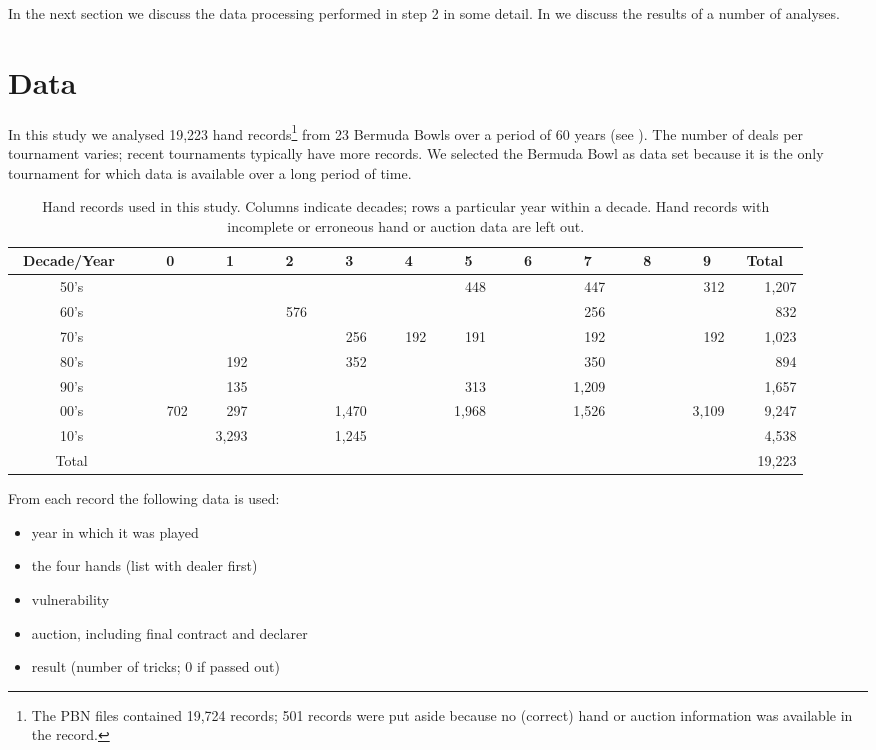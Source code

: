 \documentclass{llncs}
\begin{document}
In the next section we discuss the data processing performed in step 2
in some 
detail. In  we discuss the results of a number of
analyses.  

\section{Data}
\label{sec:data}

In this study we analysed 19,223 hand records\footnote{%
The PBN files contained 19,724 records; 501 records were put aside
because no (correct) hand or auction information was available in the
record.} 
from 23 Bermuda Bowls
over a period of 60 years (see ).  The number of deals per
tournament varies; recent tournaments typically have more records.  We
selected the Bermuda Bowl as data set because it
is the only tournament for which data is available over a long period
of time.   

\begin{table}
\centering\footnotesize
\caption{Hand records used in this study. Columns indicate decades;
  rows a particular year within  a decade. Hand records with
  incomplete or erroneous hand or auction data are left out.}
\label{tbl:data}
\begin{tabular}{|c|r|r|r|r|r|r|r|r|r|r|r|}
\hline
\bf\ Decade/Year \ &
\bf \ \ \ 0 \ &\bf \ \ \ 1 \ &\bf \ \ \ 2 \ &\bf \ \ \ 3 \ &\bf \ \ \ 4 \ &
\bf \ \ \ 5 \ &\bf \ \ \ 6 \ &\bf \ \ \ 7 \ &\bf \ \ \ 8 \ &\bf \ \ \ 9 \ &
\bf \ Total \ \\ \hline\hline
50's &  &  &  &  &  & 448 &  & 447 &  & 312 & 1,207 \\ \hline
60's &  &  & 576 &  &  &  &  & 256 &  &  & 832 \\ \hline
70's &  &  &  & 256 & 192 & 191 &  & 192 &  & 192 & 1,023 \\ \hline
80's &  & 192 &  & 352 &  &  &  & 350 &  &  & 894 \\ \hline
90's &  & 135 &  &  &  & 313 &  & 1,209 &  &  & 1,657 \\ \hline
00's & 702 & 297 &  & 1,470 &  & 1,968 &  & 1,526 &  & 3,109 & 9,247 \\ \hline
10's &  & 3,293 &  & 1,245 &  &  &  &  &  &  & 4,538 \\ \hline\hline
Total &  &  &  &  &  &  &  &  &  &  & 19,223 \\ \hline
\hline
\end{tabular}
\end{table}

From each record the following data is used: 
\begin{itemize}
\item year in which it was played
\item the four hands (list with dealer first)
\item vulnerability
\item auction, including final contract and declarer
\item result (number of tricks; 0 if passed out)
\end{itemize}
\end{document}
